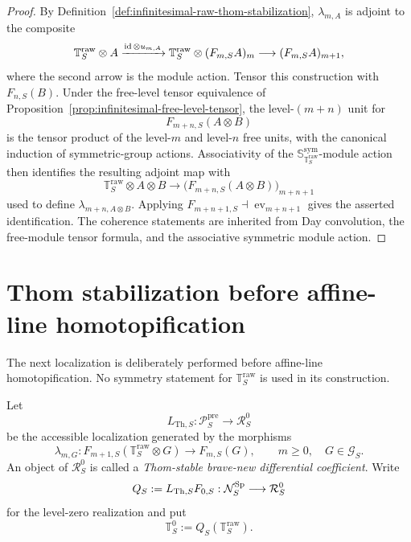 \begin{proof}
By Definition~\ref{def:infinitesimal-raw-thom-stabilization},
$\lambda_{m,A}$ is adjoint to the composite
\[
    \mathbb T_S^{\mathrm{raw}}\otimes A
    \xrightarrow{\operatorname{id}\otimes u_{m,A}}
    \mathbb T_S^{\mathrm{raw}}\otimes(F_{m,S}A)_m
    \longrightarrow
    (F_{m,S}A)_{m+1},
\]
where the second arrow is the module action.  Tensor this construction with
$F_{n,S}(B)$.  Under the free-level tensor equivalence of
Proposition~\ref{prop:infinitesimal-free-level-tensor}, the level-$(m+n)$
unit for
\[
    F_{m+n,S}(A\otimes B)
\]
is the tensor product of the level-$m$ and level-$n$ free units, with the
canonical induction of symmetric-group actions.  Associativity of the
$\mathbb S_{\mathbb T_S^{\mathrm{raw}}}^{\mathrm{sym}}$-module action then
identifies the resulting adjoint map with
\[
    \mathbb T_S^{\mathrm{raw}}\otimes A\otimes B
    \longrightarrow
    \bigl(F_{m+n,S}(A\otimes B)\bigr)_{m+n+1}
\]
used to define $\lambda_{m+n,A\otimes B}$.  Applying
$F_{m+n+1,S}\dashv\operatorname{ev}_{m+n+1}$ gives the asserted
identification.  The coherence statements are inherited from Day convolution,
the free-module tensor formula, and the associative symmetric module action.
\end{proof}

\section{Thom stabilization before affine-line homotopification}
\label{sec:infinitesimal-thom-stable-differential-category}

The next localization is deliberately performed before affine-line
homotopification.  No symmetry statement for
\(\mathbb T_S^{\mathrm{raw}}\) is used in its construction.

\begin{definition}
\label{def:infinitesimal-thom-stable-differential-category}
Let
\[
  L_{\mathrm{Th},S}:
  \mathcal P_S^{\mathrm{pre}}
  \longrightarrow
  \mathcal R_S^0
\]
be the accessible localization generated by the morphisms
\[
  \lambda_{m,G}:
  F_{m+1,S}(\mathbb T_S^{\mathrm{raw}}\otimes G)
  \longrightarrow
  F_{m,S}(G),
  \qquad
  m\geq0,
  \quad
  G\in\mathcal G_S.
\]
An object of \(\mathcal R_S^0\) is called a \emph{Thom-stable brave-new
differential coefficient}.  Write
\[
  Q_S:=L_{\mathrm{Th},S}F_{0,S}:
  \mathcal N_S^{\mathrm{Sp}}\longrightarrow\mathcal R_S^0
\]
for the level-zero realization and put
\[
  \mathbb T_S^0:=Q_S(\mathbb T_S^{\mathrm{raw}}).
\]
\end{definition}

